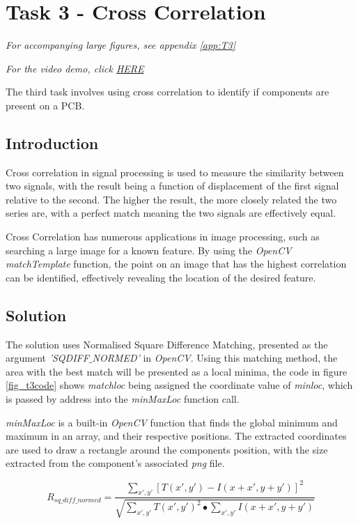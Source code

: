 \documentclass[conference]{IEEEtran}
\begin{document}
\section{Task 3 - Cross Correlation}
\textit{For accompanying large figures, see appendix \ref{app:T3}}

\textit{For the video demo, click \href{https://youtu.be/Cwiae5Vpxyg}{HERE}}

The third task involves using cross correlation to identify if components are present on a PCB.
\subsection{Introduction}
Cross correlation in signal processing is used to measure the similarity between two signals, with the result being a function of displacement of the first signal relative to the second. The higher the result, the more closely related the two series are, with a perfect match meaning the two signals are effectively equal\cite{ControlStation}. 

Cross Correlation has numerous applications in image processing, such as searching a large image for a known feature. By using the \textit{OpenCV} \textit{matchTemplate} function, the point on an image that has the highest correlation can be identified, effectively revealing the location of the desired feature. 
\subsection{Solution}
The solution uses Normalised Square Difference Matching, presented as the argument \textit{'SQDIFF$\_$NORMED'} in \textit{OpenCV}. Using this matching method, the area with the best match will be presented as a local minima\cite{LearningOpenCV}, the code in figure \ref{fig_t3code} shows \textit{matchloc} being assigned the coordinate value of \textit{minloc}, which is passed by address into the \textit{minMaxLoc} function call.


\textit{minMaxLoc} is a built-in \textit{OpenCV} function that finds the global minimum and maximum in an array, and their respective positions\cite{OpenCV_minMaxLoc}. The extracted coordinates are used to draw a rectangle around the components position, with the size extracted from the component's associated \textit{png} file.

\begin{equation}
R_{sq\_diff\_normed} = \frac{\sum_{x',y'}^{}[T(x',y')-I(x+x',y+y')]^2}{\sqrt{\sum_{x',y'}^{}T(x',y')^2 \bullet\sum_{x',y'}^{}I(x+x',y+y')}}
\end{equation}\label{eq:sq_diff}
\end{document}
